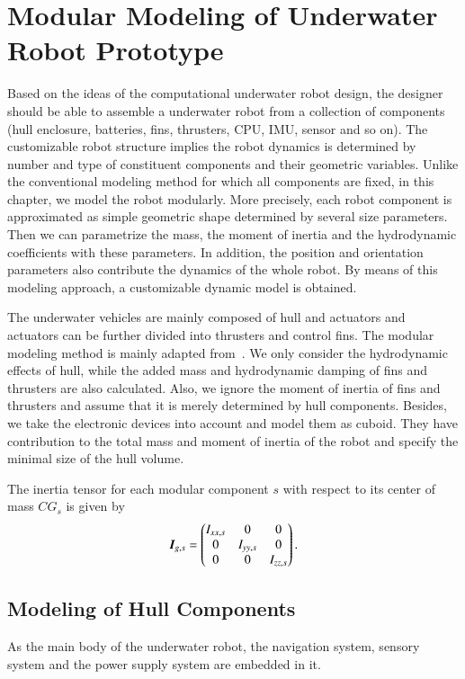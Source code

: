 \chapter{Modular Modeling of Underwater Robot Prototype}

Based \cite{opencv_library} on the ideas of the computational underwater robot design, the designer should be able to assemble a underwater robot from a collection of components (hull enclosure, batteries, fins, thrusters, CPU, IMU, sensor and so on). The customizable robot structure implies the robot dynamics is determined by number and type of constituent components and their geometric variables. Unlike the conventional modeling method for which all components are fixed, in this chapter, we model the robot modularly. More precisely, each robot component is approximated as simple geometric shape determined by several size parameters. Then we can parametrize the mass, the moment of inertia and the hydrodynamic coefficients with these parameters. In addition, the position and orientation parameters also contribute the dynamics of the whole robot. By means of this modeling approach, a customizable dynamic model is obtained.

The underwater vehicles are mainly composed of hull and actuators and actuators can be further divided into thrusters and control fins. The modular modeling method is mainly adapted from~\cite{Sia1999}. We only consider the hydrodynamic effects of hull, while the added mass and hydrodynamic damping of fins and thrusters are also calculated. Also, we ignore the moment of inertia of fins and thrusters and assume that it is merely determined by hull components. Besides, we take the electronic devices into account and model them as cuboid. They have contribution to the total mass and moment of inertia of the robot and specify the minimal size of the hull volume.   

The inertia tensor for each modular component $s$ with respect to its center of mass $CG_{s}$  is given by
\begin{align}
\emph{\textbf{I}}_{g,s}=
\begin{pmatrix}
I_{xx,s}&0&0\\
0&I_{yy,s}&0\\
0&0&I_{zz,s}
\end{pmatrix}.
\end{align} 

\section{Modeling of Hull Components}
As the main body of the underwater robot, the navigation system, sensory system and the power supply system are embedded in it. 

